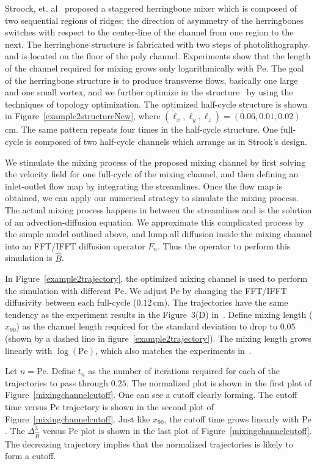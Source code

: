 \documentclass[twocolumn,10pt]{asme2e}
\begin{document}
Stroock, et. al~\cite{Stroock2002} proposed a staggered herringbone
mixer which is composed of two sequential regions of ridges; the
direction of asymmetry of the herringbones switches with respect to
the center-line of the channel from one region to the next. The
herringbone structure is fabricated with two steps of photolithography
and is located on the floor of the poly channel. Experiments show that
the length of the channel required for mixing grows only
logarithmically with $\text{Pe}$. The goal of the herringbone
structure is to produce transverse flows, basically one large and one
small vortex, and we further optimize in the structure~\cite{topopt}
by using the techniques of topology optimization. The optimized
half-cycle structure is shown in Figure~\ref{example2structureNew},
where $(\ell_x,\ell_y,\ell_z) = (0.06,0.01,0.02)\,$cm. The same
pattern repeats four times in the half-cycle structure. One full-cycle
is composed of two half-cycle channels which arrange as in Strook's
design.

We stimulate the mixing process of the proposed mixing channel by
first solving the velocity field for one full-cycle of the mixing
channel, and then defining an inlet-outlet flow map by integrating the
streamlines. Once the flow map is obtained, we can apply our numerical
strategy to simulate the mixing process. The actual mixing process
happens in between the streamlines and is the solution of an
advection-diffusion equation. We approximate this complicated process
by the simple model outlined above, and lump all diffusion inside the
mixing channel into an FFT/IFFT diffusion operator $F_n$. Thus the
operator to perform this simulation is $\hat{B}$.

In Figure~\ref{example2trajectory}, the optimized mixing channel is
used to perform the simulation with different $\text{Pe}$. We adjust
$\text{Pe}$ by changing the FFT/IFFT diffusivity between each
full-cycle ($0.12\,\text{cm}$). The trajectories have the same
tendency as the experiment results in the Figure~3(D)
in~\cite{Stroock2002}.  Define mixing length ($x_{90}$) as the channel
length required for the standard deviation to drop to $0.05$ (shown by
a dashed line in figure~\ref{example2trajectory}). The mixing length
grows linearly with $\log(\text{Pe})$, which also matches the
experiments in~\cite{Stroock2002}.

Let $n= \text{Pe}$. Define $t_n$ as the number of iterations required
for each of the trajectories to pass through $0.25$. The normalized
plot is shown in the first plot of
Figure~\ref{mixingchannelcutoff}. One can see a cutoff clearly
forming. The cutoff time versus $\text{Pe}$ trajectory is shown in the
second plot of Figure~\ref{mixingchannelcutoff}. Just like $x_{90}$,
the cutoff time grows linearly with $\text{Pe}$. The
$\Delta_{\hat{B}}^3$ versus $\text{Pe}$ plot is shown in the last plot
of Figure~\ref{mixingchannelcutoff}. The decreasing trajectory implies
that the normalized trajectories is likely to form a cutoff.
\end{document}
